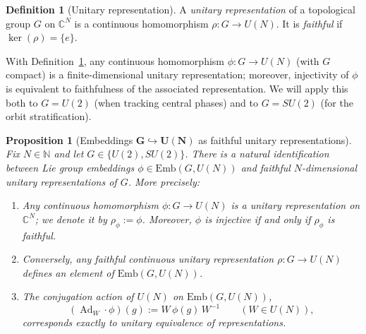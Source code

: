 \documentclass{article}%
\newtheorem{proposition}[theorem]{Proposition}
\theoremstyle{definition}
\newtheorem{definition}[theorem]{Definition}
\numberwithin{equation}{section}
\newcommand{\C}{\mathbb{C}}
\newcommand{\Emb}{\mathrm{Emb}}
\DeclareMathOperator{\Ad}{Ad}
\begin{document}
\begin{definition}[Unitary representation]\label{def:unitary_representation}
A \emph{unitary representation} of a topological group $G$ on $\C^N$ is a continuous homomorphism
$\rho:G\to U(N)$. It is \emph{faithful} if $\ker(\rho)=\{e\}$.
\end{definition}

\noindent
With Definition~\ref{def:unitary_representation}, any continuous homomorphism $\phi:G\to U(N)$ (with
$G$ compact) is a finite-dimensional unitary representation; moreover, injectivity of $\phi$ is
equivalent to faithfulness of the associated representation. We will apply this both to $G=U(2)$
(when tracking central phases) and to $G=SU(2)$ (for the orbit stratification).

\begin{proposition}[Embeddings $\boldsymbol{G\hookrightarrow U(N)}$ as faithful unitary representations]
\label{prop:embeddings_as_faithful_representations_G}
Fix $N\in\mathbb{N}$ and let $G\in\{U(2),SU(2)\}$. There is a natural identification between Lie group
embeddings $\phi\in \Emb(G,U(N))$ and faithful $N$-dimensional unitary representations of $G$. More precisely:
\begin{enumerate}
\item[(i)] Any continuous homomorphism $\phi:G\to U(N)$ is a unitary representation on $\C^N$; we denote it by $\rho_\phi:=\phi$.
Moreover, $\phi$ is injective if and only if $\rho_\phi$ is faithful.
\item[(ii)] Conversely, any faithful continuous unitary representation $\rho:G\to U(N)$ defines an element of $\Emb(G,U(N))$.
\item[(iii)] The conjugation action of $U(N)$ on $\Emb(G,U(N))$,
\[
(\Ad_W\cdot \phi)(g):=W\,\phi(g)\,W^{-1}\qquad (W\in U(N)),
\]
corresponds exactly to unitary equivalence of representations.
\end{enumerate}
\end{proposition}
\end{document}
